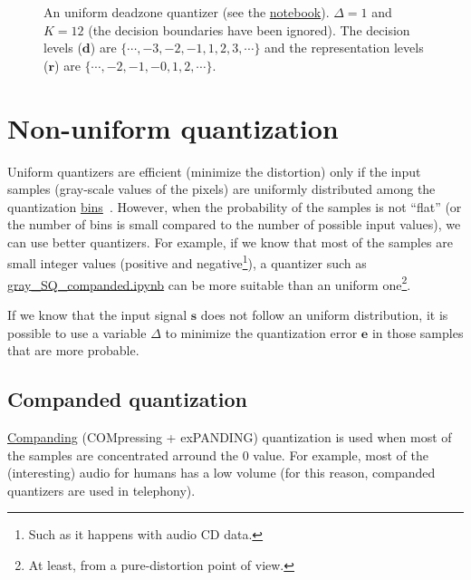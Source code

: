 \begin{figure}
  \caption{An uniform deadzone quantizer (see the
    \href{https://github.com/vicente-gonzalez-ruiz/scalar_quantization/blob/master/docs/graphics/deadzone.ipynb}{notebook}). $\Delta=1$
    and $K=12$ (the decision boundaries have been ignored). The
    decision levels (${\mathbf d}$) are
    $\{\cdots,-3,-2,-1,1,2,3,\cdots\}$ and the representation levels
    (${\mathbf r}$) are $\{\cdots,-2,-1,-0,1,2,\cdots\}$.}
  \label{fig:deadzone}
\end{figure}

\section{Non-uniform quantization}

Uniform quantizers are efficient (minimize the distortion) only if the
input samples (gray-scale values of the pixels) are uniformly
distributed among the quantization
\href{https://en.wikipedia.org/wiki/Data_binning}{bins}~\cite{vruiz__scalar_quantization}. However,
when the probability of the samples is not ``flat'' (or the number of
bins is small compared to the number of possible input values), we can
use better quantizers. For example, if we know that most of the
samples are small integer values (positive and negative\footnote{Such
  as it happens with audio CD data.}), a quantizer such as
\href{https://github.com/vicente-gonzalez-ruiz/scalar_quantization/blob/master/docs/gray_SQ_companded.ipynb}{gray\_SQ\_companded.ipynb}
can be more suitable than an uniform one\footnote{At least, from a
  pure-distortion point of view.}.

If we know that the input signal ${\mathbf s}$ does not follow an
uniform distribution, it is possible to use a variable $\Delta$ to
minimize the quantization error ${\mathbf e}$ in those
samples that are more probable.


\subsection{Companded quantization~\cite{sayood2017introduction}}

\href{https://en.wikipedia.org/wiki/Companding}{Companding}
(COMpressing + exPANDING) quantization is used when most of the
samples are concentrated arround the $0$ value. For example, most of
the (interesting) audio for humans has a low volume (for this reason,
companded quantizers are used in telephony).

